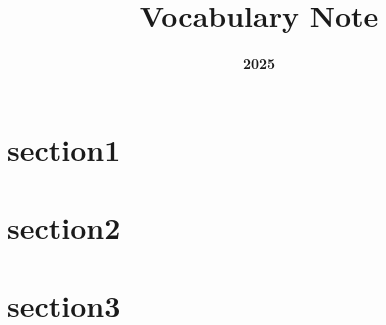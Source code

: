 \documentclass[a4paper,xelatex,ja=standard, enablejfam=true, jbase=8pt, nomag]{article}
\title{\Huge \bf Vocabulary Note}
\author{\huge \bf 2025}
\date{}
\begin{document}
\maketitle

\newpage






\section*{section1}


\newpage






\section*{section2}


\newpage






\section*{section3}


\newpage










\printindex
\end{document}
